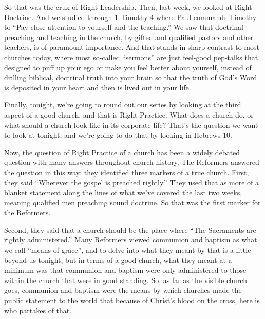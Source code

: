 \documentclass[letterpaper, 12pt]{article}
\begin{document}
    So that was the crux of Right Leadership. Then, last week, we looked
    at Right Doctrine. And we studied through 1 Timothy 4 where Paul
    commands Timothy to ``Pay close attention to yourself and the
    teaching.'' We saw that doctrinal preaching and teaching in the
    church, by gifted and qualified pastors and other teachers, is of
    paramount importance. And that stands in sharp contrast to most
    churches today, where most so-called ``sermons'' are just feel-good
    pep-talks that designed to puff up your ego or make you feel better
    about yourself, instead of drilling biblical, doctrinal truth into
    your brain so that the truth of God's Word is deposited in your
    heart and then is lived out in your life.

    Finally, tonight, we're going to round out our series by looking at
    the third aspect of a good church, and that is Right Practice. What
    does a church do, or what should a church look like in its corporate
    life? That's the question we want to look at tonight, and we're
    going to do that by looking in Hebrews 10.

    Now, the question of Right Practice of a church has been a widely
    debated question with many answers throughout church history. The
    Reformers answered the question in this way: they identified three
    markers of a true church. First, they said ``Wherever the gospel is
    preached rightly.'' They used that as more of a blanket statement
    along the lines of what we've covered the last two weeks, meaning
    qualified men preaching sound doctrine. So that was the first marker
    for the Reformers. 

    Second, they said that a church should be the place where ``The
    Sacraments are rightly administered.'' Many Reformers viewed
    communion and baptism as what we call ``means of grace'', and to
    delve into what they meant by that is a little beyond us tonight,
    but in terms of a good church, what they meant at a minimum was that
    communion and baptism were only administered to those within the
    church that were in good standing. So, as far as the visible church
    goes, communion and baptism were the means by which churches made
    the public statement to the world that because of Christ's blood on
    the cross, here is who partakes of that. 
\end{document}
